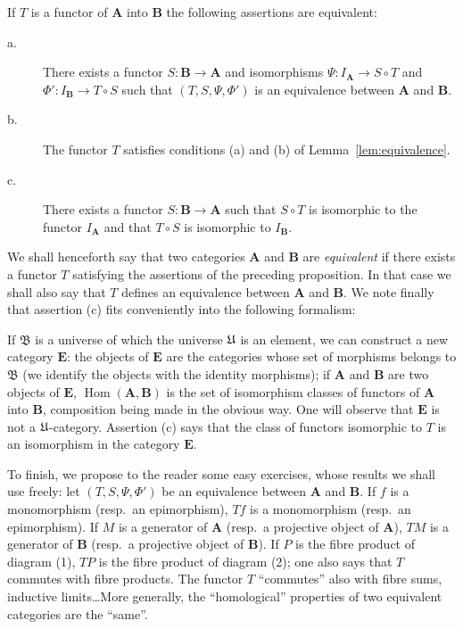\begin{proposition}\label{prop:conditions-for-equivalence}
If $T$ is a functor of $\mathbf{A}$ into $\mathbf{B}$ the following
assertions are equivalent:
\begin{description}
\item[\normalfont a.] There exists a functor $S\colon \mathbf{B}\to
      \mathbf{A}$ and isomorphisms $\Psi\colon I_{\mathbf{A}}\to S\circ T$
      and $\Phi'\colon I_{\mathbf{B}}\to T\circ S$ such that
      $(T,S,\Psi,\Phi')$ is an equivalence between $\mathbf{A}$ and
      $\mathbf{B}$.
\item[\normalfont b.] The functor $T$ satisfies conditions (a) and (b) of
      Lemma~\ref{lem:equivalence}.
\item[\normalfont c.] There exists a functor $S\colon \mathbf{B}\to
      \mathbf{A}$ such that $S\circ T$ is isomorphic to the functor
      $I_{\mathbf{A}}$ and that $T\circ S$ is isomorphic to
      $I_{\mathbf{B}}$.
\end{description}
\end{proposition}

We shall henceforth say that two categories $\mathbf{A}$ and $\mathbf{B}$
are \emph{equivalent} if there exists a functor $T$ satisfying the
assertions of the preceding proposition. In that case we shall also say
that $T$ defines an equivalence between $\mathbf{A}$ and $\mathbf{B}$. We
note finally that assertion (c) fits conveniently into the following
formalism:

If $\mathfrak{B}$ is a universe of which the universe $\mathfrak{U}$ is an
element, we can construct a new category $\mathbf{E}$: the objects of
$\mathbf{E}$ are the categories whose set of morphisms belongs to
$\mathfrak{B}$ (we identify the objects with the identity morphisms); if
$\mathbf{A}$ and $\mathbf{B}$ are two objects of $\mathbf{E}$,
$\operatorname{Hom}(\mathbf{A},\mathbf{B})$ is the set of isomorphism
classes of functors of $\mathbf{A}$ into $\mathbf{B}$, composition being
made in the obvious way. One will observe that $\mathbf{E}$ is not a
$\mathfrak{U}$-category. Assertion (c) says that the class of functors isomorphic
to $T$ is an isomorphism in the category $\mathbf{E}$.

To finish, we propose to the reader some easy exercises, whose results we
shall use freely: let $(T,S,\Psi,\Phi')$ be an equivalence between
$\mathbf{A}$ and $\mathbf{B}$. If $f$ is a monomorphism (resp.\ an
epimorphism), $Tf$ is a monomorphism (resp.\ an epimorphism). If $M$ is a
generator of $\mathbf{A}$ (resp.\ a projective object of $\mathbf{A}$),
$TM$ is a generator of $\mathbf{B}$ (resp.\ a projective object of
$\mathbf{B}$). If $P$ is the fibre product of diagram (1), $TP$ is the
fibre product of diagram (2); one also says that $T$ commutes with
fibre products. The functor $T$ ``commutes'' also with fibre sums,
inductive limits\ldots More generally, the ``homological'' properties of
two equivalent categories are the ``same''.


